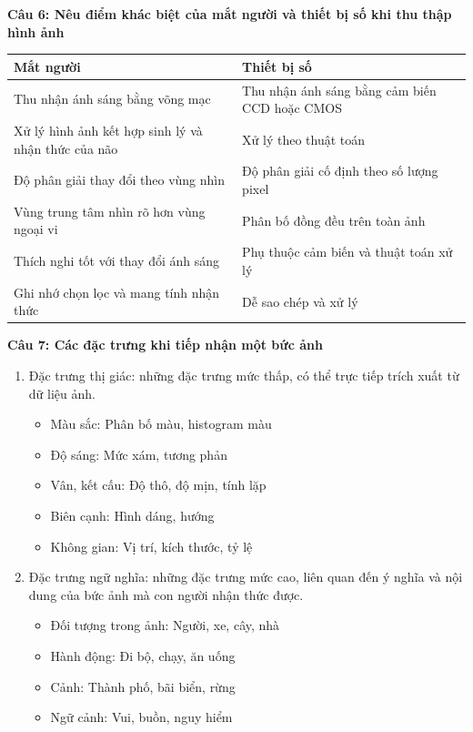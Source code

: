 \textbf{Câu 6: Nêu điểm khác biệt của mắt người và thiết bị số khi thu thập hình ảnh}

\begin{table}[H]
	\centering
	\begin{tabular}{|p{7cm}|p{7cm}|}
		\hline
		Mắt người & Thiết bị số \\ \hline
		Thu nhận ánh sáng bằng võng mạc & Thu nhận ánh sáng bằng cảm biến CCD hoặc CMOS \\ \hline
		Xử lý hình ảnh kết hợp sinh lý và nhận thức của não & Xử lý theo thuật toán \\ \hline
		Độ phân giải thay đổi theo vùng nhìn & Độ phân giải cố định theo số lượng pixel \\ \hline
		Vùng trung tâm nhìn rõ hơn vùng ngoại vi & Phân bố đồng đều trên toàn ảnh \\ \hline
		Thích nghi tốt với thay đổi ánh sáng & Phụ thuộc cảm biến và thuật toán xử lý \\ \hline
		Ghi nhớ chọn lọc và mang tính nhận thức & Dễ sao chép và xử lý \\ \hline
	\end{tabular}
\end{table}

\textbf{Câu 7: Các đặc trưng khi tiếp nhận một bức ảnh}

\begin{enumerate}
	\item Đặc trưng thị giác: những đặc trưng mức thấp, có thể trực tiếp trích xuất từ dữ liệu ảnh.
	
	\begin{itemize}
		\item Màu sắc: Phân bố màu, histogram màu
		
		\item Độ sáng: Mức xám, tương phản
		
		\item Vân, kết cấu: Độ thô, độ mịn, tính lặp
		
		\item Biên cạnh: Hình dáng, hướng
		
		\item Không gian: Vị trí, kích thước, tỷ lệ
	\end{itemize}
	
	\item Đặc trưng ngữ nghĩa: những đặc trưng mức cao, liên quan đến ý nghĩa và nội dung của bức ảnh mà con người nhận thức được.
	
	\begin{itemize}
		\item Đối tượng trong ảnh: Người, xe, cây, nhà
		
		\item Hành động: Đi bộ, chạy, ăn uống
		
		\item Cảnh: Thành phố, bãi biển, rừng
		
		\item Ngữ cảnh: Vui, buồn, nguy hiểm
	\end{itemize}
\end{enumerate}

